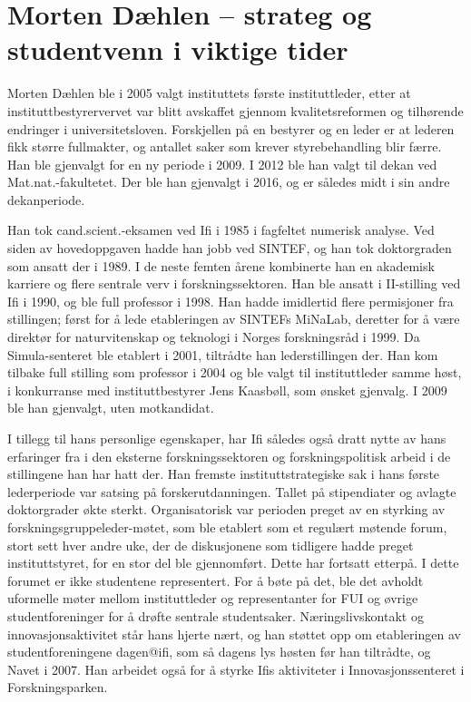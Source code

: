 \chapter[Morten Dæhlen]{Morten Dæhlen – strateg og studentvenn i viktige tider}

\author{Av Narve Trædal}

Morten Dæhlen ble i 2005 valgt instituttets første instituttleder, etter at instituttbestyrervervet var blitt avskaffet gjennom kvalitetsreformen og tilhørende endringer i universitetsloven. Forskjellen på en bestyrer og en leder er at lederen fikk større fullmakter, og antallet saker som krever styrebehandling blir færre. Han ble gjenvalgt for en ny periode i 2009. I 2012 ble han valgt til dekan ved Mat.nat.-fakultetet. Der ble han gjenvalgt i 2016, og er således midt i sin andre dekanperiode.

Han tok cand.scient.-eksamen ved Ifi i 1985 i fagfeltet numerisk analyse. Ved siden av hovedoppgaven hadde han jobb ved SINTEF, og han tok doktorgraden som ansatt der i 1989. I de neste femten årene kombinerte han en akademisk karriere og flere sentrale verv i forskningssektoren. Han ble ansatt i II-stilling ved Ifi i 1990, og ble full professor i 1998. Han hadde imidlertid flere permisjoner fra stillingen; først for å lede etableringen av SINTEFs MiNaLab, deretter for å være direktør for naturvitenskap og teknologi i Norges forskningsråd i 1999. Da Simula-senteret ble etablert i 2001, tiltrådte han lederstillingen der. Han kom tilbake full stilling som professor i 2004 og ble valgt til instituttleder samme høst, i konkurranse med instituttbestyrer Jens Kaasbøll, som ønsket gjenvalg. I 2009 ble han gjenvalgt, uten motkandidat.

I tillegg til hans personlige egenskaper, har Ifi således også dratt nytte av hans erfaringer fra i den eksterne forskningssektoren og forskningspolitisk arbeid i de stillingene han har hatt der. Han fremste instituttstrategiske sak i hans første lederperiode var satsing på forskerutdanningen. Tallet på stipendiater og avlagte doktorgrader økte sterkt. Organisatorisk var perioden preget av en styrking av forskningsgruppeleder-møtet, som ble etablert som et regulært møtende forum, stort sett hver andre uke, der de diskusjonene som tidligere hadde preget instituttstyret, for en stor del ble gjennomført. Dette har fortsatt etterpå. I dette forumet er ikke studentene representert. For å bøte på det, ble det avholdt uformelle møter mellom instituttleder og representanter for FUI og øvrige studentforeninger for å drøfte sentrale studentsaker. Næringslivskontakt og innovasjonsaktivitet står hans hjerte nært, og han støttet opp om etableringen av studentforeningene dagen@ifi, som så dagens lys høsten før han tiltrådte, og Navet i 2007. Han arbeidet også for å styrke Ifis aktiviteter i Innovasjonssenteret i Forskningsparken.

